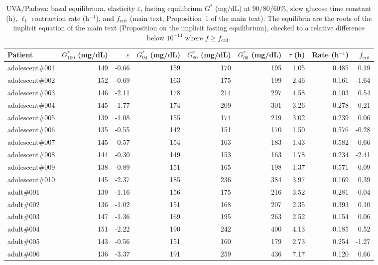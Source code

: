 \begin{table}[H]
\centering
\caption{UVA/Padova: basal equilibrium, elasticity $\varepsilon$, fasting equilibrium $G^*$ (mg/dL) at 90/80/60\%, slow glucose time constant (h), $\ell_1$ contraction rate (h$^{-1}$), and $f_{\mathrm{crit}}$ (main text, Proposition~1 of the main text). The equilibria are the roots of the implicit equation of the main text (Proposition on the implicit fasting equilibrium), checked to a relative difference below $10^{-14}$ where $f\ge f_{\mathrm{crit}}$.}\label{tab:S2b}
\scriptsize
\begin{tabular}{lrrrrrrrr}
\toprule
Patient & $G^*_{100}$ (mg/dL) & $\varepsilon$ & $G^*_{90}$ (mg/dL) & $G^*_{80}$ (mg/dL) & $G^*_{60}$ (mg/dL) & $\tau$ (h) & Rate (h$^{-1}$) & $f_{\mathrm{crit}}$ \\
\midrule
adolescent\#001 & 149 & -0.66 & 159 & 170 & 195 & 1.05 & 0.485 & 0.19 \\
adolescent\#002 & 152 & -0.69 & 163 & 175 & 199 & 2.46 & 0.161 & -1.64 \\
adolescent\#003 & 146 & -2.11 & 178 & 214 & 297 & 4.58 & 0.103 & 0.54 \\
adolescent\#004 & 145 & -1.77 & 174 & 209 & 301 & 3.26 & 0.278 & 0.21 \\
adolescent\#005 & 139 & -1.08 & 155 & 174 & 219 & 3.02 & 0.239 & 0.06 \\
adolescent\#006 & 135 & -0.55 & 142 & 151 & 170 & 1.50 & 0.576 & -0.28 \\
adolescent\#007 & 145 & -0.57 & 154 & 163 & 183 & 1.43 & 0.582 & -0.66 \\
adolescent\#008 & 144 & -0.30 & 149 & 153 & 163 & 1.78 & 0.234 & -2.41 \\
adolescent\#009 & 138 & -0.89 & 151 & 165 & 198 & 1.37 & 0.571 & -0.09 \\
adolescent\#010 & 145 & -2.37 & 185 & 236 & 384 & 3.97 & 0.169 & 0.39 \\
adult\#001 & 139 & -1.16 & 156 & 175 & 216 & 3.52 & 0.281 & -0.04 \\
adult\#002 & 136 & -1.02 & 151 & 168 & 207 & 2.35 & 0.393 & 0.10 \\
adult\#003 & 147 & -1.36 & 169 & 195 & 263 & 2.52 & 0.154 & 0.06 \\
adult\#004 & 151 & -2.22 & 190 & 242 & 400 & 4.13 & 0.185 & 0.52 \\
adult\#005 & 143 & -0.56 & 151 & 160 & 179 & 2.73 & 0.254 & -1.27 \\
adult\#006 & 136 & -3.37 & 191 & 259 & 436 & 7.17 & 0.120 & 0.66 \\

\end{tabular}
\end{table}

